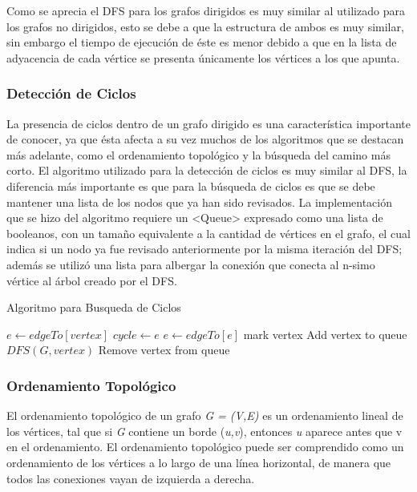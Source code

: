 \documentclass[a4paper, 11pt]{report}
\begin{document}
Como se aprecia el DFS para los grafos dirigidos es muy similar al utilizado para los grafos no dirigidos, esto se debe a que la estructura de ambos es muy similar, sin embargo el tiempo de ejecuci\'on de \'este es menor debido a que en la lista de adyacencia de cada v\'ertice se presenta \'unicamente los v\'ertices a los que apunta.

\subsubsection{Detecci\'on de Ciclos}

La presencia de ciclos dentro de un grafo dirigido es una caracter\'istica importante de conocer, ya que \'esta afecta a su vez muchos de los algoritmos que se destacan m\'as adelante, como el ordenamiento topol\'ogico y la b\'usqueda del camino m\'as corto. El algoritmo utilizado para la detecci\'on de ciclos es muy similar al DFS, la diferencia m\'as importante es que para la b\'usqueda de ciclos es que se debe mantener una lista de los nodos que ya han sido revisados. La implementaci\'on que se hizo del algoritmo requiere un <Queue> expresado como una lista de booleanos, con un tama\~no equivalente a la cantidad de v\'ertices en el grafo, el cual indica si un nodo ya fue revisado anteriormente por la misma iteraci\'on del DFS; adem\'as se utiliz\'o una lista para albergar la conexi\'on que conecta al n-simo v\'ertice al \'arbol creado por el DFS. 

\begin{algorithm}[!h]
\caption{Algoritmo para Busqueda de Ciclos}
\label{CycleDetection}
\begin{algorithmic}
				\State $e\gets edgeTo[vertex]$
					\State $cycle\gets e$
                    \State $e\gets edgeTo[e]$
				\EndWhile				
                \State mark vertex
				\State Add vertex to queue
                \State $DFS(G,vertex)$
            \EndIf
        \EndFor
		\State Remove vertex from queue
    \EndProcedure
\end{algorithmic}
\end{algorithm}

\subsubsection{Ordenamiento Topol\'ogico}
El ordenamiento topol\'ogico de un grafo \textit{G = (V,E)} es un ordenamiento lineal de los v\'ertices, tal que si \textit{G} contiene un borde (\textit{u,v}), entonces \textit{u} aparece antes que v en el ordenamiento. El ordenamiento topol\'ogico puede ser comprendido como un ordenamiento de los v\'ertices a lo largo de una l\'inea horizontal, de manera que todos las conexiones vayan de izquierda a derecha. 
\end{document}
